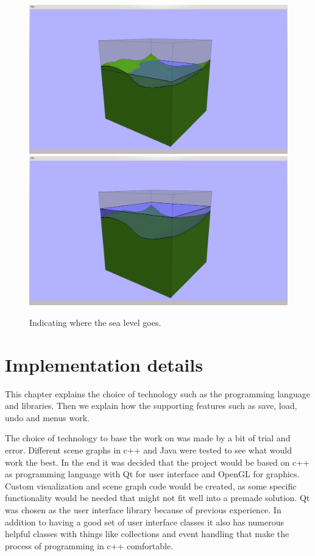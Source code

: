 \documentclass[a4paper,12pt]{report}
\begin{document}
\begin{figure}
\includegraphics[trim = 90mm 7mm 80mm 30mm, clip,width=.5\linewidth]{thesis/results/seaEnabled.png}
\includegraphics[trim = 90mm 7mm 80mm 30mm, clip,width=.5\linewidth]{thesis/results/seaChanged.png}
 \caption{Indicating where the sea level goes.}
 \label{fig:seaLevel}
\end{figure}

\section{Implementation details}
\label{sec:tech}
This chapter explains the choice of technology such as the programming language and libraries. Then we explain how the supporting features such as save, load, undo and menus work.

The choice of technology to base the work on was made by a bit of trial and error. Different scene graphs in c++ and Java were tested to see what would work the best. In the end it was decided that the project would be based on c++ as programming language with Qt for user interface and OpenGL for graphics. Custom visualization and scene graph code would be created, as some specific functionality would be needed that might not fit well into a premade solution. Qt was chosen as the user interface library because of previous experience. In addition to having a good set of user interface classes it also has numerous helpful classes with things like collections and event handling that make the process of programming in c++ comfortable.
\end{document}
